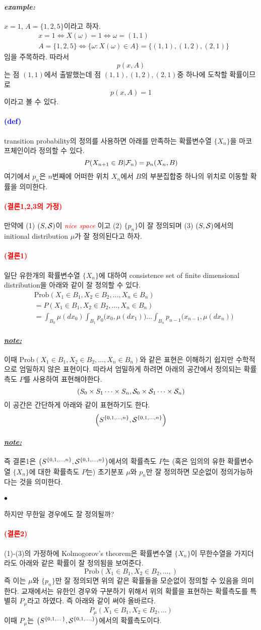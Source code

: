 \documentclass[12pt,oneside,english]{book}
\def\ck{\paragraph{\Large$\bullet$}\Large}
\def\note{\paragraph{\Large\textit{\underline{note:}}}\Large}
\def\ex{\paragraph{\Large\textit{example:}}\Large}
\newcommand{\parablue}[1]{\paragraph{\Large\textcolor{blue}{(#1)}}\Large}
\newcommand{\parared}[1]{\paragraph{\Large\textcolor{red}{(#1)}}\Large}
\begin{document}
\ex $x=1$, $A=\{1,2,5\}$이라고 하자. 
\begin{align*}
& x=1 \Leftrightarrow X(\omega)=1 \Leftrightarrow \omega=(1,1) \\ 
& A=\{1,2,5\} \Leftrightarrow \{\omega:X(\omega) \in A\}=\{(1,1),(1,2),(2,1)\}
\end{align*}
임을 주목하라. 따라서 
\[
p(x,A)
\] 
는 점 $(1,1)$에서 출발했는데 점 $(1,1),(1,2),(2,1)$중 하나에 도착할 확률이므로 
\[
p(x,A)=1
\]
이라고 볼 수 있다. 

\parablue{def} transition probability의 정의를 사용하면 아래를 만족하는 확률변수열 $\{X_n\}$을 마코프체인이라 정의할 수 있다. 
\[
P(X_{n+1}\in B|{\cal F}_n)=p_n(X_n,B)
\]
여기에서 $p_n$은 $n$번째에 어떠한 위치 $X_n$에서 $B$의 부분집합중 하나의 위치로 이동할 확률을 의미한다. 

\parared{결론1,2,3의 가정} 만약에 (1) $(S,{\cal S})$이 \textcolor{red}{\emph{nice space}} 이고 (2) $\{p_n\}$이 잘 정의되며 (3) $(S,{\cal S})$에서의 initional distribution $\mu$가 잘 정의된다고 하자. 

\parared{결론1} 일단 유한개의 확률변수열 $\{X_n\}$에 대하여 consistence set of finite dimensional distribution을 아래와 같이 잘 정의할 수 있다. 
\begin{align*}
& \mbox{Prob}(X_1\in B_1, X_2\in B_2, \dots, X_n \in B_n)\\
& = P(X_1\in B_1, X_2\in B_2, \dots, X_n \in B_n)\\
& = \int_{B_0}\mu(dx_0)\int_{B_1}p_0\big(x_0,\mu(dx_1)\big)\dots\int_{B_n}p_{n-1}\big(x_{n-1},\mu(dx_n)\big)
\end{align*}
\note 이때 $\mbox{Prob}(X_1\in B_1, X_2\in B_2, \dots, X_n \in B_n)$와 같은 표현은 이해하기 쉽지만 수학적으로 엄밀하지 않은 표현이다. 따라서 엄밀하게 하려면 아래의 공간에서 정의되는 확률측도 $P$를 사용하여 표현해야한다. 
\[
(S_0\times S_1 \dots \times S_n, {\cal S}_0\times {\cal S}_1 \dots \times {\cal S}_n)
\]
이 공간은 간단하게 아래와 같이 표현하기도 한다. 
\[
\left(S^{\{0,1,\dots,n\}},{\cal S}^{\{0,1,\dots,n\}}\right)
\]

\note 즉 결론1은 $\left(S^{\{0,1,\dots,n\}},{\cal S}^{\{0,1,\dots,n\}}\right)$에서의 확률측도 $P$는 (혹은 임의의 유한 확률변수열 $\{X_n\}$에 대한 확률측도 $P$는) 초기분포 $\mu$와 $p_n$만 잘 정의하면 모순없이 정의가능하다는 것을 의미한다.

\ck 하지만 무한일 경우에도 잘 정의될까? 

\parared{결론2} (1)-(3)의 가정하에 Kolmogorov's theorem은 확률변수열 $\{X_n\}$이 무한수열을 가지더라도 아래와 같은 확률이 잘 정의됨을 보여준다. 
\[
\mbox{Prob}(X_1\in B_1, X_2\in B_2, \dots, )
\]
즉 이는 $\mu$와 $\{p_n\}$만 잘 정의되면 위의 같은 확률들을 모순없이 정의할 수 있음을 의미한다. 교재에서는 유한인 경우와 구분하기 위해서 위의 확률을 표현하는 확률측도를 특별히 $P_{\mu}$라고 하였다. 즉 아래와 같이 써야 올바르다. 
\[
P_{\mu}(X_1\in B_1, X_2\in B_2, \dots)
\]
이때 $P_{\mu}$는 $\left(S^{\{0,1,\dots\}},{\cal S}^{\{0,1,\dots,\}}\right)$에서의 확률측도이다. 
\end{document}
